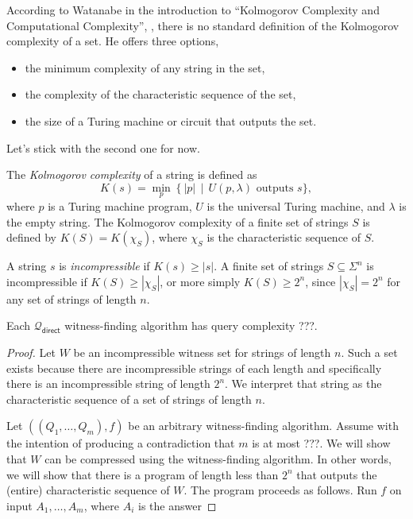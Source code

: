 \documentclass{article}
\newcommand{\mc}{\mathcal}
\newcommand{\direct}{\mathsf{direct}}
\begin{document}
According to Watanabe in the introduction to ``Kolmogorov Complexity and Computational Complexity'', \autocite{???}, there is no standard definition of the Kolmogorov complexity of a set.
He offers three options,
\begin{itemize}
\item the minimum complexity of any string in the set,
\item the complexity of the characteristic sequence of the set,
\item the size of a Turing machine or circuit that outputs the set.
\end{itemize}
Let's stick with the second one for now.

The \emph{Kolmogorov complexity} of a string is defined as
\begin{equation*}
  K(s) = \min_{p} \left\{ |p| \,\middle|\, U(p, \lambda) \text{ outputs } s\},
\end{equation*}
where $p$ is a Turing machine program, $U$ is the universal Turing machine, and $\lambda$ is the empty string.
The Kolmogorov complexity of a finite set of strings $S$ is defined by $K(S) = K(\chi_S)$, where $\chi_S$ is the characteristic sequence of $S$.

A string $s$ is \emph{incompressible} if $K(s) \geq |s|$.
A finite set of strings $S \subseteq \Sigma^n$ is incompressible if $K(S) \geq |\chi_S|$, or more simply $K(S) \geq 2^n$, since $|\chi_S| = 2^n$ for any set of strings of length $n$.

\begin{theorem}
  Each $\mc{Q}_{\direct}$ witness-finding algorithm has query complexity ???.
\end{theorem}
\begin{proof}
  Let $W$ be an incompressible witness set for strings of length $n$.
  Such a set exists because there are incompressible strings of each length \autocite{???} and specifically there is an incompressible string of length $2^n$.
  We interpret that string as the characteristic sequence of a set of strings of length $n$.

  Let $((Q_1, \dotsc, Q_m), f)$ be an arbitrary witness-finding algorithm.
  Assume with the intention of producing a contradiction that $m$ is at most ???.
  We will show that $W$ can be compressed using the witness-finding algorithm.
  In other words, we will show that there is a program of length less than $2^n$ that outputs the (entire) characteristic sequence of $W$.
  The program proceeds as follows.
  Run $f$ on input $A_1, \dotsc, A_m$, where $A_i$ is the answer

\end{proof}
\end{document}

